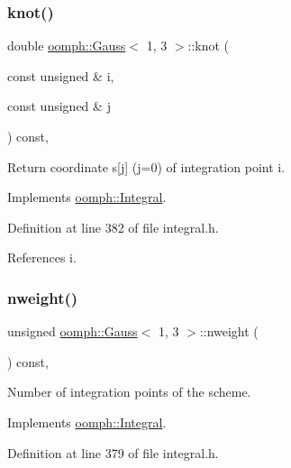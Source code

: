 \subsubsection{\texorpdfstring{knot()}{knot()}}
{\footnotesize\ttfamily double \hyperlink{classoomph_1_1Gauss}{oomph\+::\+Gauss}$<$ 1, 3 $>$\+::knot (\begin{DoxyParamCaption}\item[{const unsigned \&}]{i,  }\item[{const unsigned \&}]{j }\end{DoxyParamCaption}) const\hspace{0.3cm}{\ttfamily [inline]}, {\ttfamily [virtual]}}



Return coordinate s\mbox{[}j\mbox{]} (j=0) of integration point i. 



Implements \hyperlink{classoomph_1_1Integral_a1a2122f99a87c18649bafdd9ed739758}{oomph\+::\+Integral}.



Definition at line 382 of file integral.\+h.



References i.

\mbox{\label{classoomph_1_1Gauss_3_011_00_013_01_4_a8521ff77bcac8afc612779aed48f3bd4}} 
\subsubsection{\texorpdfstring{nweight()}{nweight()}}
{\footnotesize\ttfamily unsigned \hyperlink{classoomph_1_1Gauss}{oomph\+::\+Gauss}$<$ 1, 3 $>$\+::nweight (\begin{DoxyParamCaption}{ }\end{DoxyParamCaption}) const\hspace{0.3cm}{\ttfamily [inline]}, {\ttfamily [virtual]}}



Number of integration points of the scheme. 



Implements \hyperlink{classoomph_1_1Integral_a1a270de9d99a1fcf1d25a6c1017f65fa}{oomph\+::\+Integral}.



Definition at line 379 of file integral.\+h.


